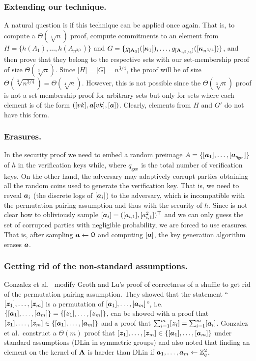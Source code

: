 \subsubsection{Extending our technique.}
A natural question is if this technique can be applied once again. That is, to compute a $\Theta(\sqrt[4]{n})$  proof, compute commitments to an element from $H=\{h(A_1),\ldots,h(A_{n^{3/4}})\}$ and
$G=\allowbreak\{
	g_{[\mathbf{{A_1}}]}
		([
			{\boldsymbol{\kappa}}_1]),
	\ldots,\allowbreak
	g_{[\mathbf{{A}}_{n^3/4}]}
		([
			{\boldsymbol{\kappa}}_{n^{3/4}}
])\}$,
and then prove that they belong to the respective sets with our set-membership proof of size $\Theta(\sqrt[3]{n})$. Since $|H|=|G|=n^{3/4}$, the proof will be of size $\Theta(\sqrt[3]{n^{3/4}})=\Theta(\sqrt[4]{n})$. However, this is not possible since the $\Theta(\sqrt[3]{n})$ proof is not a set-membership proof for arbitrary sets but only for sets where each element is of the form $([vk],{\boldsymbol{a}}[vk],[{\boldsymbol{a}}])$. Clearly, elements from $H$ and $G'$ do not have this form.


\subsubsection{Erasures.}
In the security proof we need to embed a random preimage $A=\{[{\boldsymbol{a}}_1],\ldots,\allowbreak [{\boldsymbol{a}}_{q_{\mathsf{gen}}}]\}$ of $h$ in the verification keys while, where $q_{\mathsf{gen}}$ is the total number of verification keys. On the other hand, the adversary may adaptively corrupt parties obtaining all the random coins used to generate the verification key. That is, we need to reveal ${\boldsymbol{a}}_i$ (the discrete logs of $[{\boldsymbol{a}}_i]$) to the adversary, which is incompatible with the permutation pairing assumption and thus with the security of $h$. Since is not clear how to obliviously sample $[{\boldsymbol{a}}_i]=([a_{i,1}],[a_{i,1}^2])^\top$ and we can only guess the set of corrupted parties with negligible probability, we are forced to use erasures. That is, after sampling ${\boldsymbol{a}}\gets\mathcal{Q}$ and computing $[{\boldsymbol{a}}]$, the key generation algorithm erases ${\boldsymbol{a}}$.

\subsubsection{Getting rid of the non-standard assumptions.} Gonzalez et al.~\cite{ACNS:GonRaf16} modify Groth and Lu's proof of correctness of a shuffle \cite{AC:GroLu07} to get rid of the permutation pairing assumption. They showed that the statement ``$[{\boldsymbol{z}}_1],\ldots,[{\boldsymbol{z}}_m]$ is a permutation of $[{\boldsymbol{a}}_1],\ldots,[{\boldsymbol{a}}_m]$'', i.e.~$\{[{\boldsymbol{a}}_1],\ldots,[{\boldsymbol{a}}_m]\}=\{[{\boldsymbol{z}}_1],\ldots,[{\boldsymbol{z}}_m]\}$, can be showed with a proof that $[{\boldsymbol{z}}_1],\ldots,[{\boldsymbol{z}}_m]\in\{[{\boldsymbol{a}}_1],\ldots,[{\boldsymbol{a}}_m]\}$ and a proof that $\sum_{i=1}^m [{\boldsymbol{z}}_i]=\sum_{i=1}^m [{\boldsymbol{a}}_i]$.  Gonzalez et al.~construct a $\Theta(m)$ proof that $[{\boldsymbol{z}}_1],\ldots,[{\boldsymbol{z}}_m]\in\{[{\boldsymbol{a}}_1],\ldots\allowbreak,[{\boldsymbol{a}}_m]\}$ under standard assumptions (DLin in symmetric groups)  and also noted that finding an element on the kernel of $\mathbf{{A}}$ is harder than DLin if ${\boldsymbol{a}}_1,\ldots,{\boldsymbol{a}}_m\gets\mathbb{Z}_q^2$.

